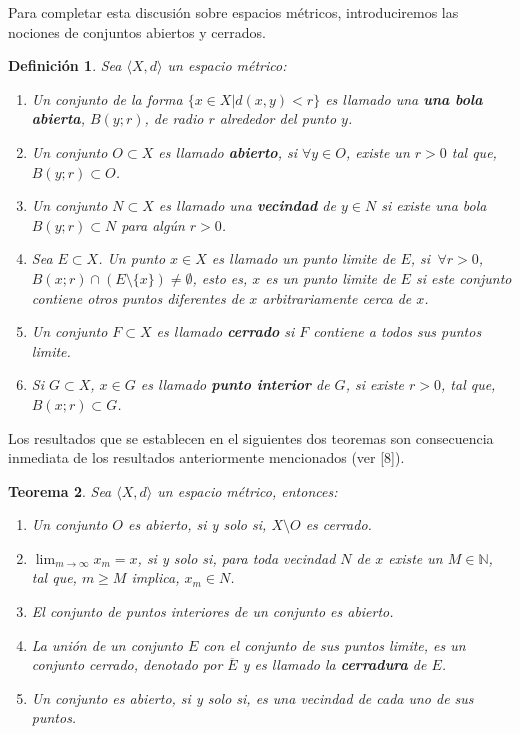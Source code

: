 \documentclass[12pt]{book}
\numberwithin{equation}{chapter}
\newtheorem{theorem}{Teorema}[chapter]
\newtheorem{definition}[theorem]{Definici\'on}
\def\n{\noindent}
\def\la{\langle}
\def\ra{\rangle}
\def\rar{\rightarrow}
\begin{document}
Para completar esta discusi\'on sobre espacios m\'etricos, introduciremos las nociones de conjuntos abiertos y cerrados.
\begin{definition}
Sea $\la X,d \ra$ un espacio m\'etrico:
\begin{enumerate}
\item Un conjunto de la forma $\{ x \in X | d(x,y)<r \}$ es llamado una {\bf una bola abierta}, $B(y;r)$, de radio $r$ alrededor del punto $y$. 

\item Un conjunto $ O \subset X $ es llamado {\bf abierto}, si $\forall y \in O$, existe un  $ r >0$ tal que, $B(y;r) \subset O$.

\item Un conjunto $N \subset X$ es llamado una {\bf vecindad} de $y \in N$ si existe una bola $B(y;r) \subset N$ para alg\'un $r>0$.

\item Sea $E \subset X$. Un punto $x \in X$ es llamado un punto limite de $E$, si $\, \forall r >0$, $ B(x;r) \cap (E \setminus \{x\}) \neq \emptyset $, esto es, $x$ es un punto limite de $E$ si este conjunto contiene otros puntos diferentes de $x$ arbitrariamente cerca de $x$.

\item Un conjunto $F \subset X$ es llamado {\bf cerrado} si $F$ contiene a todos sus puntos limite.

\item Si $G \subset X$, $x \in G$ es llamado {\bf punto interior} de $G$, si existe $r>0$, tal que, $ B(x;r) \subset G $.

\end{enumerate}
\end{definition}  

\vspace{5 mm}

\n Los resultados que se establecen en el siguientes dos teoremas son consecuencia inmediata de los resultados anteriormente mencionados (ver [8]).

\vspace{5 mm}

\begin{theorem}
Sea $\la X , d \ra$ un espacio m\'etrico, entonces:
\begin{enumerate}
\item Un conjunto $O$ es abierto, si y solo si, $X \setminus O$ es cerrado.
\item $\lim_{m \rar \infty} x_{m}=x $, si y solo si, para toda vecindad $N$ de $x$ existe un $M \in \mathbb{N}$, tal que, $m \geq M$ implica, $x_{m} \in N$. 
\item El conjunto de puntos interiores de un conjunto es abierto.
\item La uni\'on de un conjunto $E$ con el conjunto de sus puntos limite, es un conjunto cerrado, denotado por $\overline{E}$ y es llamado la {\bf cerradura} de $E$.
\item Un conjunto es abierto, si y solo si, es una vecindad de cada uno de sus puntos.
\end{enumerate}
\end{theorem}
\end{document}
